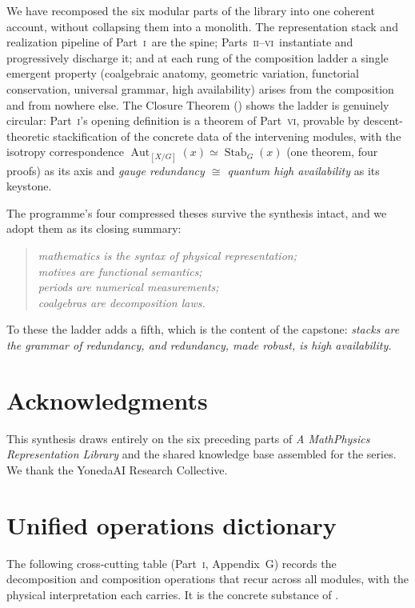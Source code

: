 \documentclass[12pt]{article}
\theoremstyle{definition}
\theoremstyle{remark}
\newcommand{\Aut}{\operatorname{Aut}}
\newcommand{\Stab}{\operatorname{Stab}}
\newcommand{\MtoP}{Math\textrightarrow{}Physics}
\newcommand{\PI}{\textsc{i}}
\newcommand{\PII}{\textsc{ii}}
\newcommand{\PVI}{\textsc{vi}}
\begin{document}
We have recomposed the six modular parts of the library into one coherent account,
without collapsing them into a monolith.  The representation stack and realization
pipeline of Part~\PI\ are the spine; Parts~\PII--\PVI\ instantiate and progressively
discharge it; and at each rung of the composition ladder a single emergent property
(coalgebraic anatomy, geometric variation, functorial conservation, universal grammar,
high availability) arises from the composition and from nowhere else.  The Closure
Theorem () shows the ladder is genuinely circular: Part~\PI's
opening definition is a theorem of Part~\PVI, provable by descent-theoretic
stackification of the concrete data of the intervening modules, with the isotropy
correspondence $\Aut_{[X/G]}(x)\simeq\Stab_G(x)$ (one theorem, four proofs) as its
axis and \emph{gauge redundancy $\cong$ quantum high availability} as its keystone.

The programme's four compressed theses survive the synthesis intact, and we adopt them
as its closing summary:
\begin{quote}
\emph{mathematics is the syntax of physical representation;\\
motives are functional semantics;\\
periods are numerical measurements;\\
coalgebras are decomposition laws.}
\end{quote}
To these the ladder adds a fifth, which is the content of the capstone:
\emph{stacks are the grammar of redundancy, and redundancy, made robust, is high
availability.}

\section*{Acknowledgments}
This synthesis draws entirely on the six preceding parts of \emph{A \MtoP{}
Representation Library} and the shared knowledge base assembled for the series.  We
thank the YonedaAI Research Collective.

\appendix

\section{Unified operations dictionary}
\label{app:ops}

The following cross-cutting table (Part~\PI, Appendix~G) records the decomposition and
composition operations that recur across all modules, with the physical interpretation
each carries.  It is the concrete substance of .
\end{document}
